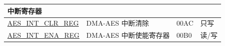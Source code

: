 \begin{longtable}{ | p{5.2cm} | p{6.6cm} | p{2cm} | p{1.2cm} | }
\multicolumn{4}{|l|}{\textbf{中断寄存器}} \\ \hline

\hyperref[regdesc:AESINTCLRREG]{AES\_INT\_CLR\_REG}			&	DMA-AES 中断清除	& \hexprefix{}00AC & 只写 \\ \hline
\hyperref[regdesc:AESINTENAREG]{AES\_INT\_ENA\_REG}			&	DMA-AES 中断使能寄存器	& \hexprefix{}00B0 & 读/写 \\ \hline

\end{longtable}
